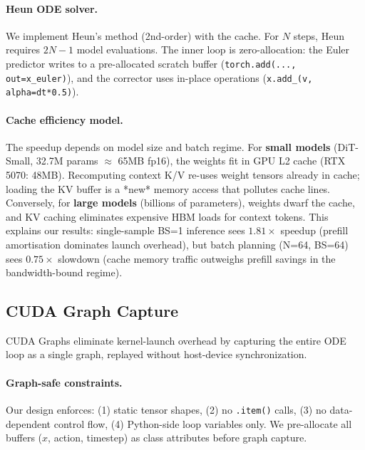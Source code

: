 \documentclass[letterpaper,twocolumn,10pt]{article}
\begin{document}
\paragraph{Heun ODE solver.}
We implement Heun's method (2nd-order) with the cache.  For $N$ steps,
Heun requires $2N-1$ model evaluations.  The inner loop is zero-allocation:
the Euler predictor writes to a pre-allocated scratch buffer
(\texttt{torch.add(..., out=x\_euler)}), and the corrector uses in-place
operations (\texttt{x.add\_(v, alpha=dt*0.5)}).

\paragraph{Cache efficiency model.}
The speedup depends on model size and batch regime.  For
\textbf{small models} (DiT-Small, 32.7M params $\approx$ 65MB fp16), the
weights fit in GPU L2 cache (RTX 5070: 48MB).  Recomputing context K/V
re-uses weight tensors already in cache; loading the KV buffer is a
*new* memory access that pollutes cache lines.  Conversely, for
\textbf{large models} (billions of parameters), weights dwarf the cache,
and KV caching eliminates expensive HBM loads for context tokens.  This
explains our results: single-sample BS=1 inference sees $1.81\times$
speedup (prefill amortisation dominates launch overhead), but batch
planning (N=64, BS=64) sees $0.75\times$ slowdown (cache memory traffic
outweighs prefill savings in the bandwidth-bound regime).

\subsection{CUDA Graph Capture}

CUDA Graphs eliminate kernel-launch overhead by capturing the entire ODE
loop as a single graph, replayed without host-device synchronization.

\paragraph{Graph-safe constraints.}
Our design enforces: (1) static tensor shapes, (2) no \texttt{.item()}
calls, (3) no data-dependent control flow, (4) Python-side loop
variables only.  We pre-allocate all buffers ($x$, action, timestep) as
class attributes before graph capture.
\end{document}
